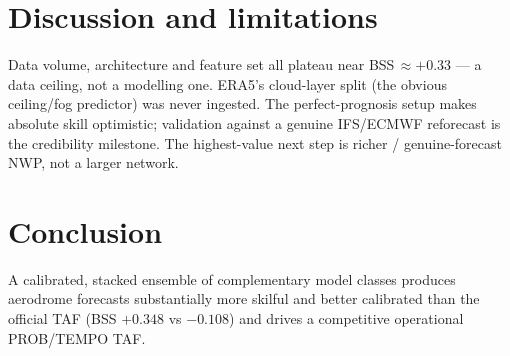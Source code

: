 \documentclass[11pt]{article}
\begin{document}
\section{Discussion and limitations}
Data volume, architecture and feature set all plateau near BSS\,$\approx +0.33$ --- a data
ceiling, not a modelling one. ERA5's cloud-layer split (the obvious ceiling/fog predictor)
was never ingested. The perfect-prognosis setup makes absolute skill optimistic; validation
against a genuine IFS/ECMWF reforecast is the credibility milestone. The highest-value next
step is richer / genuine-forecast NWP, not a larger network.

\section{Conclusion}
A calibrated, stacked ensemble of complementary model classes produces aerodrome forecasts
substantially more skilful and better calibrated than the official TAF
(BSS $+0.348$ vs $-0.108$) and drives a competitive operational PROB/TEMPO TAF.
\end{document}
